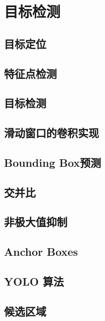 \documentclass[../../main.tex]{subfiles}
\begin{document}
\chapter{目标检测}

\section{目标定位}

\section{特征点检测}

\section{目标检测}

\section{滑动窗口的卷积实现}

\section{Bounding Box预测}

\section{交并比}

\section{非极大值抑制}

\section{Anchor Boxes}

\section{YOLO 算法}

\section{候选区域}
\end{document}
